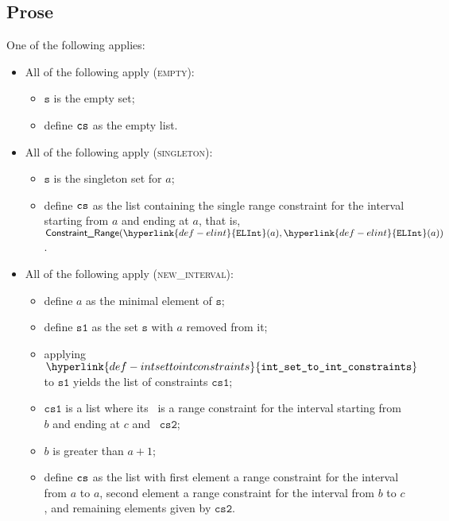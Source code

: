 \documentclass{book}
\newcommand\ELInt[1]{\hyperlink{def-elint}{\texttt{ELInt}}(#1)}
\newcommand\intsettointconstraints[0]{\hyperlink{def-intsettointconstraints}{\texttt{int\_set\_to\_int\_constraints}}}
\newcommand\vs[0]{\texttt{s}}
\newcommand\vsone[0]{\texttt{s1}}
\newcommand\csone[0]{\texttt{cs1}}
\newcommand\cstwo[0]{\texttt{cs2}}
\begin{document}
\subsection{Prose}
One of the following applies:
\begin{itemize}
  \item All of the following apply (\textsc{empty}):
  \begin{itemize}
    \item $\vs$ is the empty set;
    \item define $\texttt{cs}$ as the empty list.
  \end{itemize}

  \item All of the following apply (\textsc{singleton}):
  \begin{itemize}
    \item $\vs$ is the singleton set for $a$;
    \item define $\texttt{cs}$ as the list containing the single range constraint for the interval starting from $a$
          and ending at $a$, that is, $\ConstraintRange(\ELInt{a}, \ELInt{a})$.
  \end{itemize}

  \item All of the following apply (\textsc{new\_interval}):
  \begin{itemize}
    \item define $a$ as the minimal element of $\vs$;
    \item define $\vsone$ as the set $\vs$ with $a$ removed from it;
    \item applying $\intsettointconstraints$ to $\vsone$ yields the list of constraints $\csone$;
    \item $\csone$ is a list where its \head\ is a range constraint for the interval starting from $b$ and ending at $c$
          and \tail\ $\cstwo$;
    \item $b$ is greater than $a+1$;
    \item define $\texttt{cs}$ as the list with first element a range constraint for the interval from $a$ to $a$,
          second element a range constraint for the interval from $b$ to $c$, and remaining elements given by $\cstwo$.
  \end{itemize}


\end{itemize}
\end{document}
